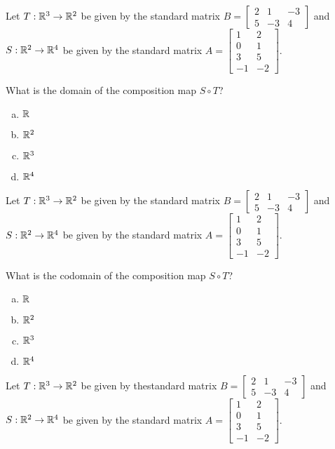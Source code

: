 \begin{applicationActivities}

\begin{activity}{5}
Let $T: \mathbb{R}^3 \rightarrow \mathbb{R}^2$ be given by the standard matrix $B=\begin{bmatrix} 2 & 1 & -3 \\ 5 & -3 & 4 \end{bmatrix}$ and $S: \mathbb{R}^2 \rightarrow \mathbb{R}^4$ be given by the standard matrix $A=\begin{bmatrix} 1 & 2 \\ 0 & 1 \\ 3 & 5 \\ -1 & -2 \end{bmatrix}$.

What is the domain of the composition map $S \circ T$?
\begin{enumerate}[(a)]
\item $\mathbb{R}$
\item $\mathbb{R}^2$
\item $\mathbb{R}^3$
\item $\mathbb{R}^4$
\end{enumerate}
\end{activity}

\begin{activity}{2}
Let $T: \mathbb{R}^3 \rightarrow \mathbb{R}^2$ be given by the standard matrix $B=\begin{bmatrix} 2 & 1 & -3 \\ 5 & -3 & 4 \end{bmatrix}$ and $S: \mathbb{R}^2 \rightarrow \mathbb{R}^4$ be given by the standard matrix $A=\begin{bmatrix} 1 & 2 \\ 0 & 1 \\ 3 & 5 \\ -1 & -2 \end{bmatrix}$.

What is the codomain of the composition map $S \circ T$?
\begin{enumerate}[(a)]
\item $\mathbb{R}$
\item $\mathbb{R}^2$
\item $\mathbb{R}^3$
\item $\mathbb{R}^4$
\end{enumerate}
\end{activity}

\begin{activity}{2}
Let $T: \mathbb{R}^3 \rightarrow \mathbb{R}^2$ be given by thestandard  matrix $B=\begin{bmatrix} 2 & 1 & -3 \\ 5 & -3 & 4 \end{bmatrix}$ and $S: \mathbb{R}^2 \rightarrow \mathbb{R}^4$ be given by the standard matrix $A=\begin{bmatrix} 1 & 2 \\ 0 & 1 \\ 3 & 5 \\ -1 & -2 \end{bmatrix}$.


\end{activity}
\end{applicationActivities}
